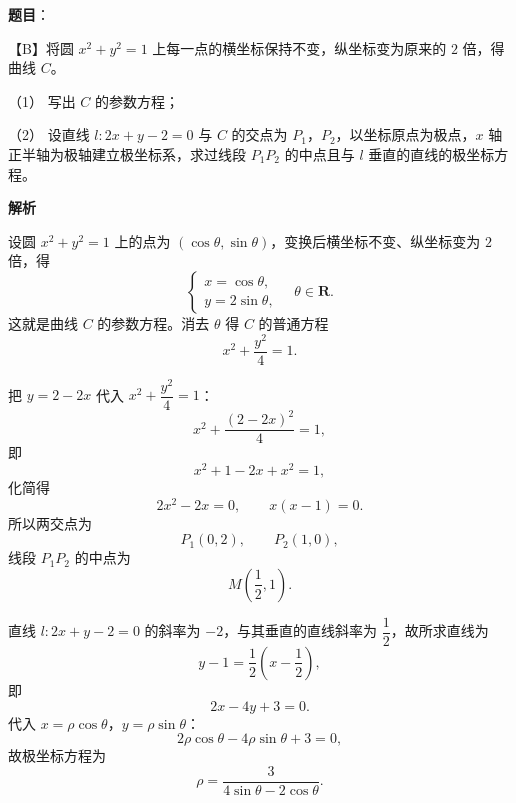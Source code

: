\begin{answer}

\textbf{题目}：

【B】将圆 $x^2+y^2=1$ 上每一点的横坐标保持不变，纵坐标变为原来的 $2$ 倍，得曲线 $C$。

（1） 写出 $C$ 的参数方程；

（2） 设直线 $l:2x+y-2=0$ 与 $C$ 的交点为 $P_1$，$P_2$，以坐标原点为极点，$x$ 轴正半轴为极轴建立极坐标系，求过线段 $P_1P_2$ 的中点且与 $l$ 垂直的直线的极坐标方程。

\textbf{解析}


设圆 $x^2+y^2=1$ 上的点为 $(\cos\theta,\sin\theta)$，变换后横坐标不变、纵坐标变为 $2$ 倍，得
\nopagebreak[4]
\[\begin{cases}
x=\cos\theta,\\
y=2\sin\theta,
\end{cases}\quad\theta\in\mathbf R.\]
这就是曲线 $C$ 的参数方程。消去 $\theta$ 得 $C$ 的普通方程
\nopagebreak[4]
\[x^2+\frac{y^2}4=1.\]


把 $y=2-2x$ 代入 $x^2+\dfrac{y^2}4=1$：
\nopagebreak[4]
\[x^2+\frac{(2-2x)^2}4=1,\]
即
\nopagebreak[4]
\[x^2+1-2x+x^2=1,\]
化简得
\nopagebreak[4]
\[2x^2-2x=0,\qquad x(x-1)=0.\]
所以两交点为
\nopagebreak[4]
\[P_1(0,2),\qquad P_2(1,0),\]
线段 $P_1P_2$ 的中点为
\nopagebreak[4]
\[M\left(\frac12,1\right).\]

直线 $l:2x+y-2=0$ 的斜率为 $-2$，与其垂直的直线斜率为 $\dfrac12$，故所求直线为
\nopagebreak[4]
\[y-1=\frac12\left(x-\frac12\right),\]
即
\nopagebreak[4]
\[2x-4y+3=0.\]
代入 $x=\rho\cos\theta$，$y=\rho\sin\theta$：
\nopagebreak[4]
\[2\rho\cos\theta-4\rho\sin\theta+3=0,\]
故极坐标方程为
\nopagebreak[4]
\[\rho=\frac3{4\sin\theta-2\cos\theta}.\]



\end{answer}
